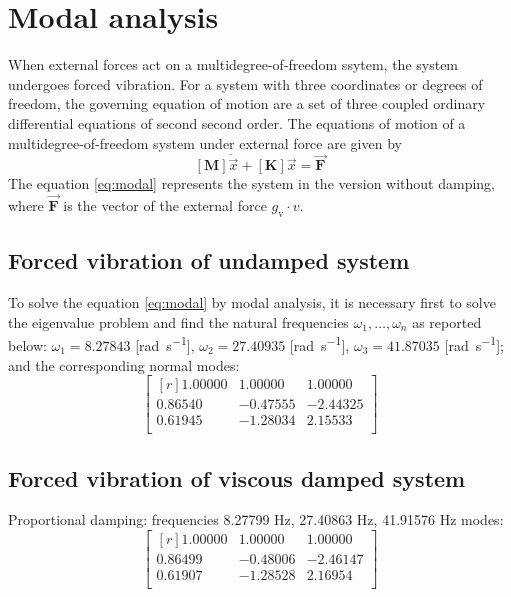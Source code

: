 \chapter{Modal analysis}\label{chap:modalanalysis}
When external forces act on a multidegree-of-freedom ssytem, the system
undergoes forced vibration.
For a system with three coordinates or degrees of freedom, the governing
equation of motion are a set of three coupled ordinary differential equations of
second second order.
The equations of motion of a multidegree-of-freedom system under external force
are given by
\begin{equation}
  \label{eq:modal}
  [\mathbf{M}] \ddot{\vec{x}} + [\mathbf{K}] \vec{x} = \vec{\mathbf{F}}
\end{equation}
The equation \eqref{eq:modal} represents the system in the version without
damping, where \(\vec{\mathbf{F}}\) is the vector of the external force
\(g_{\text{v}} \cdot v\).
\section{Forced vibration of undamped system}\label{sec:eigen}
To solve the equation \eqref{eq:modal} by modal analysis, it is necessary first
to solve the eigenvalue problem and find the natural frequencies \(\omega_1,
\dots, \omega_n\) as reported below: 
\(\omega_{1} = 8.27843\) [\si{\radian\per\second}],
\(\omega_{2} = 27.40935\) [\si{\radian\per\second}],
\(\omega_{3} = 41.87035\) [\si{\radian\per\second}];
and the corresponding normal modes:
\begin{equation}
	\label{eq:eiegnmodefree}
 	\begin{bmatrix*}[r]
 		1.00000 & 1.00000 & 1.00000 \\
		0.86540 &-0.47555 &-2.44325 \\
		0.61945 &-1.28034 & 2.15533 \\
 	\end{bmatrix*}
\end{equation}
\section{Forced vibration of viscous damped system}\label{sec:viscoussystem}
Proportional damping:
 frequencies 8.27799 \si{\hertz}, 27.40863 \si{\hertz}, 41.91576 \si{\hertz}
 modes:
\begin{equation}
\label{eq:eiegnmodeprop}
 \begin{bmatrix*}[r]
	1.00000 & 1.00000 & 1.00000 \\
	0.86499 &-0.48006 &-2.46147 \\
	0.61907 &-1.28528 & 2.16954 \\
 \end{bmatrix*}
\end{equation}
%

